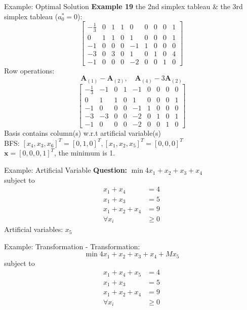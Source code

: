\documentclass[aspectratio=169,hyperref,UTF8,CJK]{beamer}
\begin{document}
\begin{frame}{Example: Optimal Solution}
\textbf{Example 19}
the 2nd simplex tableau \& the 3rd simplex tableau (\(a_0^* = 0\)):
\[
\begin{bmatrix}
-\frac{1}{3} & 0 & 1 & 1 & 0 & 0 & 0 & 0 & 1 \\
0 & 1 & 1 & 0 & 1 & 0 & 0 & 0 & 1 \\
-1 & 0 & 0 & 0 & -1 & 1 & 0 & 0 & 0 \\
-3 & 0 & 3 & 0 & 1 & 0 & 1 & 0 & 4 \\
-1 & 0 & 0 & 0 & -2 & 0 & 0 & 1 & 0
\end{bmatrix}
\]
Row operations:
\[
\mathbf{A}_{(1)} - \mathbf{A}_{(2)}, \quad \mathbf{A}_{(4)} - 3\mathbf{A}_{(2)}
\]
\[
\begin{bmatrix}
-\frac{1}{3} & -1 & 0 & 1 & -1 & 0 & 0 & 0 & 0 \\
0 & 1 & 1 & 0 & 1 & 0 & 0 & 0 & 1 \\
-1 & 0 & 0 & 0 & -1 & 1 & 0 & 0 & 0 \\
-3 & -3 & 0 & 0 & -2 & 0 & 1 & 0 & 1 \\
-1 & 0 & 0 & 0 & -2 & 0 & 0 & 1 & 0
\end{bmatrix}
\]
Basis contains column(s) w.r.t artificial variable(s) \\
BFS: \([x_4, x_3, x_6]^T = [0, 1, 0]^T, [x_1, x_2, x_5]^T = [0, 0, 0]^T\) \\
\(\mathbf{x} = [0, 0, 0, 1]^T\), the minimum is 1.
\end{frame}

\begin{frame}{Example: Artificial Variable}
\textbf{Question:} \(\min 4x_1 + x_2 + x_3 + x_4\) \\
subject to
\begin{align*}
x_1 + x_4 &= 4 \\
x_1 + x_3 &= 5 \\
x_1 + x_2 + x_4 &= 9 \\
\forall x_i &\geq 0
\end{align*}
Artificial variables: \(x_5\)
\end{frame}

\begin{frame}{Example: Transformation}
- Transformation:
\[
\min 4x_1 + x_2 + x_3 + x_4 + Mx_5
\]
subject to
\begin{align*}
x_1 + x_4 + x_5 &= 4 \\
x_1 + x_3 &= 5 \\
x_1 + x_2 + x_4 &= 9 \\
\forall x_i &\geq 0
\end{align*}
\end{frame}
\end{document}
